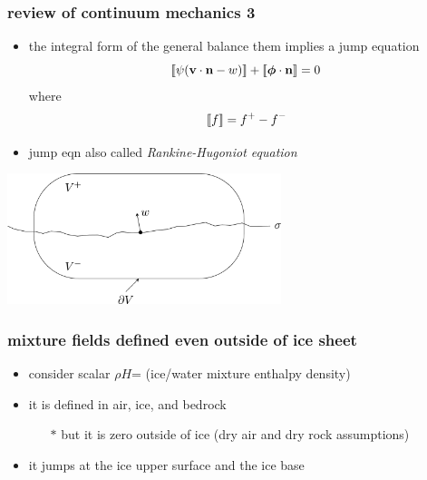 \documentclass{beamer}
\newcommand {\jl}{[\![}
\newcommand {\jr}{]\!\hskip 0.003cm ]}
\begin{document}
\begin{frame}
  \frametitle{review of continuum mechanics 3}

\begin{itemize}
\item the integral form of the general balance them implies a \alert{jump equation}
	$$\jl \psi (\mathbf{v} \cdot \mathbf{n} - w) \jr + \jl \boldsymbol{\phi} \cdot \mathbf{n} \jr =0$$
where
	$$\jl f \jr = f^+ - f^-$$
\item jump eqn also called \emph{Rankine-Hugoniot equation}
\end{itemize}

  \begin{center}
    \includegraphics[width=0.6\textwidth]{simplepillbox}
  \end{center}
\end{frame}


\begin{frame}
  \frametitle{mixture fields defined even outside of ice sheet}
\begin{itemize}
\item consider scalar $\rho H$= (ice/water mixture enthalpy density)
\item it is defined in air, ice, and bedrock
  \begin{itemize}
  \item[$\ast$] but it is zero outside of ice (dry air and dry rock assumptions)
  \end{itemize}
\item it jumps at the ice upper surface and the ice base
\end{itemize}

\begin{center}
\resizebox{0.7\textwidth}{!}{
    
}
\end{center}
\end{frame}
\end{document}
